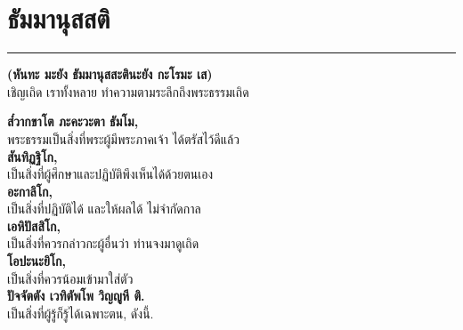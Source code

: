 \documentclass[12pt]{article}
\begin{document}
\section{ธัมมานุสสติ}
\hrule
\begin{center}
\textbf{(หันทะ มะยัง ธัมมานุสสะตินะยัง กะโรมะ เส)}\\
เชิญเถิด เราทั้งหลาย ทำความตามระลึกถึงพระธรรมเถิด
\end{center}
\textbf{ส๎วากขาโต ภะคะวะตา ธัมโม,}\\
\indent พระธรรมเป็นสิ่งที่พระผู้มีพระภาคเจ้า ได้ตรัสไว้ดีแล้ว\\
\textbf{สันทิฏฐิโก,}\\
\indent เป็นสิ่งที่ผู้ศึกษาและปฏิบัติพึงเห็นได้ด้วยตนเอง\\
\textbf{อะกาลิโก,}\\
\indent เป็นสิ่งที่ปฏิบัติได้ และให้ผลได้ ไม่จำกัดกาล\\
\textbf{เอหิปัสสิโก,}\\
\indent เป็นสิ่งที่ควรกล่าวกะผู้อื่นว่า ท่านจงมาดูเถิด\\
\textbf{โอปะนะยิโก,}\\
\indent เป็นสิ่งที่ควรน้อมเข้ามาใส่ตัว\\
\textbf{ปัจจัตตัง เวทิตัพโพ วิญญูหี  ติ.}\\
\indent เป็นสิ่งที่ผู้รู้ก็รู้ได้เฉพาะตน, ดังนี้.

\pagebreak
\end{document}
